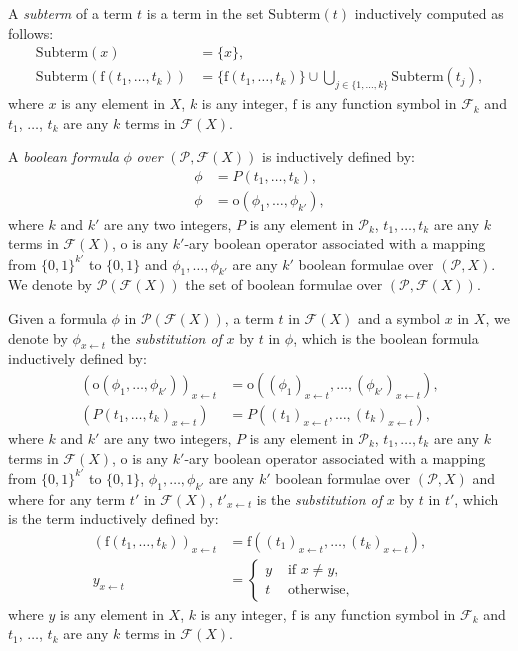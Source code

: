 \documentclass[a4paper]{llncs}
\begin{document}
    A \emph{subterm} of a term $t$ is a term in the set $\mathrm{Subterm}(t)$ inductively computed as follows:
  \begin{align*}
        \mathrm{Subterm}(x) & =\{x\},\\
        \mathrm{Subterm}(\mathrm{f}(t_1,\ldots,t_k)) & =\{\mathrm{f}(t_1,\ldots,t_k)\}\cup \bigcup_{j\in\{1,\ldots,k\}}\mathrm{Subterm}(t_j),
  \end{align*}
  where $x$ is any element in $X$, $k$ is any integer, $\mathrm{f}$ is any function symbol in $\mathcal{F}_k$ and $t_1$, $\ldots$, $t_k$ are any $k$ terms in $\mathcal{F}(X)$.
     
    A \emph{boolean formula} $\phi$ \emph{over} $(\mathcal{P},\mathcal{F}(X))$ is inductively defined by:
  \begin{align*}
        \phi & =P(t_1,\ldots,t_k),\\
        \phi & =\mathrm{o}(\phi_1,\ldots,\phi_{k'}),
  \end{align*}
  where $k$ and $k'$ are any two integers, $P$ is any element in $\mathcal{P}_k$, $t_1,\ldots,t_k$ are any $k$ terms in $\mathcal{F}(X)$, $\mathrm{o}$ is any
    $k'$-ary boolean operator associated with a mapping from $\{0,1\}^{k'}$ to $\{0,1\}$
  and $\phi_1,\ldots,\phi_{k'}$ are any $k'$ boolean formulae over $(\mathcal{P},X)$. We denote by $\mathcal{P}(\mathcal{F}(X))$ the set of boolean formulae over $(\mathcal{P},\mathcal{F}(X))$.
  
  Given a formula $\phi$ in $\mathcal{P}(\mathcal{F}(X))$, a term $t$ in $\mathcal{F}(X)$ and a symbol $x$ in $X$, we denote by $\phi_{x\leftarrow t}$ the \emph{substitution of} $x$ by $t$ in $\phi$, which is the boolean formula inductively defined by:
  \begin{align*}
        (\mathrm{o}(\phi_1,\ldots,\phi_{k'}))_{x\leftarrow t} & =\mathrm{o}((\phi_1)_{x\leftarrow t},\ldots,(\phi_{k'})_{x\leftarrow t}),\\
        (P(t_1,\ldots,t_k)_{x\leftarrow t}) & =P((t_1)_{x\leftarrow t},\ldots,(t_k)_{x\leftarrow t}),
  \end{align*}
  where $k$ and $k'$ are any two integers, $P$ is any element in $\mathcal{P}_k$, $t_1,\ldots,t_k$ are any $k$ terms in $\mathcal{F}(X)$, $\mathrm{o}$ is any
    $k'$-ary boolean operator associated with a mapping from $\{0,1\}^{k'}$ to $\{0,1\}$, $\phi_1,\ldots,\phi_{k'}$ are any $k'$ boolean formulae over $(\mathcal{P},X)$ and where for any term $t'$ in $\mathcal{F}(X)$, $t'_{x\leftarrow t}$ is the \emph{substitution of} $x$ by $t$ in $t'$, which is the term inductively defined by:
  \begin{align*}
        (\mathrm{f}(t_1,\ldots,t_k))_{x\leftarrow t} & =\mathrm{f}((t_1)_{x\leftarrow t},\ldots,(t_k)_{x\leftarrow t}),\\
        y_{x\leftarrow t} & =
          \begin{cases}
      y & \text{ if }x\neq y,\\
      t & \text{ otherwise,}
      \end{cases}
  \end{align*}
  where $y$ is any element in $X$, $k$ is any integer, $\mathrm{f}$ is any function symbol in $\mathcal{F}_k$ and $t_1$, $\ldots$, $t_k$ are any $k$ terms in $\mathcal{F}(X)$.
  
\end{document}
